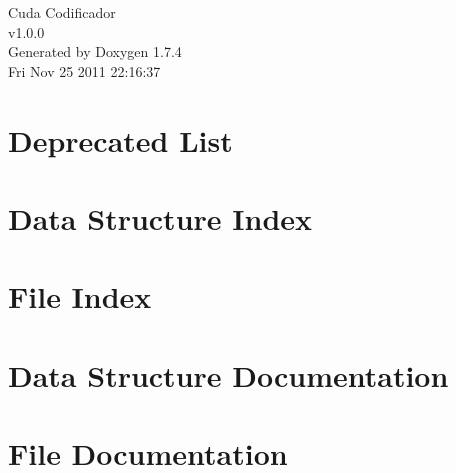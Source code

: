 \documentclass[a4paper]{book}
\begin{document}
\begin{titlepage}
\vspace*{7cm}
\begin{center}
{\Large Cuda Codificador \\[1ex]\large v1.0.0 }\\
\vspace*{1cm}
{\large Generated by Doxygen 1.7.4}\\
\vspace*{0.5cm}
{\small Fri Nov 25 2011 22:16:37}\\
\end{center}
\end{titlepage}
\clearemptydoublepage
{}
\tableofcontents
\clearemptydoublepage
{}
\chapter{Deprecated List}
\label{deprecated}

\chapter{Data Structure Index}

\chapter{File Index}

\chapter{Data Structure Documentation}



\chapter{File Documentation}





\printindex
\end{document}
